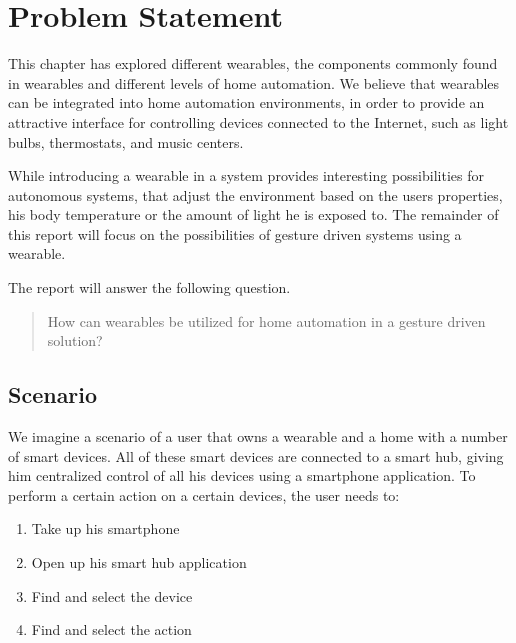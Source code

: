 \section{Problem Statement}\label{sec:researchstatement}

This chapter has explored different wearables, 
the components commonly found in wearables and different levels of home automation. 
We believe that wearables can be integrated into home automation environments, 
in order to provide an attractive interface for controlling devices connected to the Internet, 
such as light bulbs, thermostats, and music centers.

While introducing a wearable in a system provides interesting possibilities for autonomous systems, 
that adjust the environment based on the users properties, 
\eg his body temperature or the amount of light he is exposed to. 
The remainder of this report will focus on the possibilities of gesture driven systems using a wearable.

The report will answer the following question.

\begin{framed}
    \begin{quote}
      How can wearables be utilized for home automation in a gesture driven solution?
    \end{quote}
\end{framed}

\subsection{Scenario}
We imagine a scenario of a user that owns a wearable and a home with a number of smart devices. 
All of these smart devices are connected to a smart hub, 
giving him centralized control of all his devices using \eg a smartphone application.
To perform a certain action on a certain devices, the user needs to:
\begin{enumerate}
  \item Take up his smartphone
  \item Open up his smart hub application
  \item Find and select the device
  \item Find and select the action
\end{enumerate}

